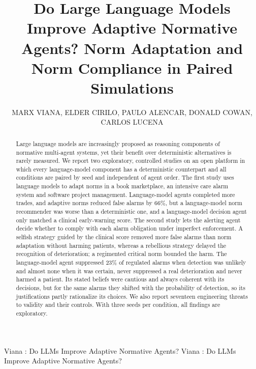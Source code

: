 \documentclass{ieeeaccess}
\begin{document}

\title{Do Large Language Models Improve Adaptive Normative Agents? Norm Adaptation and Norm Compliance in Paired Simulations}
\author{\uppercase{Marx Viana},
\uppercase{Elder Cirilo},
\uppercase{Paulo Alencar},
\uppercase{Donald Cowan},
\uppercase{Carlos Lucena}}

\address[1]{Pontifical Catholic University of Rio de Janeiro, Rio de Janeiro, Brazil \{mleles, lucena\}@inf.puc-rio.br}
\address[2]{Federal University of São João del Rei, Minas Gerais, Brazil \{elder\}@ufsj.edu.br}
\address[3]{David R. Cheriton School of Computer Science, University of Waterloo, Waterloo, Ontario, Canada \{palencar, dcowan\}@uwaterloo.ca}


\markboth
{Viana \headeretal: Do LLMs Improve Adaptive Normative Agents?}
{Viana \headeretal: Do LLMs Improve Adaptive Normative Agents?}


\begin{abstract}
Large language models are increasingly proposed as reasoning components of normative multi-agent systems, yet their benefit over deterministic alternatives is rarely measured. We report two exploratory, controlled studies on an open platform in which every language-model component has a deterministic counterpart and all conditions are paired by seed and independent of agent order. The first study uses language models to adapt norms in a book marketplace, an intensive care alarm system and software project management. Language-model agents completed more trades, and adaptive norms reduced false alarms by 66\%, but a language-model norm recommender was worse than a deterministic one, and a language-model decision agent only matched a clinical early-warning score. The second study lets the alerting agent decide whether to comply with each alarm obligation under imperfect enforcement. A selfish strategy guided by the clinical score removed more false alarms than norm adaptation without harming patients, whereas a rebellious strategy delayed the recognition of deterioration; a regimented critical norm bounded the harm. The language-model agent suppressed 23\% of regulated alarms when detection was unlikely and almost none when it was certain, never suppressed a real deterioration and never harmed a patient. Its stated beliefs were cautious and always coherent with its decisions, but for the same alarms they shifted with the probability of detection, so its justifications partly rationalize its choices. We also report seventeen engineering threats to validity and their controls. With three seeds per condition, all findings are exploratory.
\end{abstract}
\end{document}

